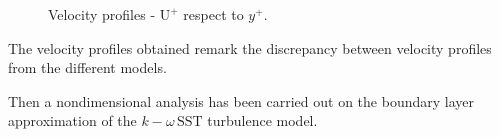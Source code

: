 \documentclass[a4paper,12pt]{article}
\newcommand{\komegasst}{$k\!-\!\omega \, \text{SST} $ }
\begin{document}
\begin{figure}[H]
\centering
{}
\caption{Velocity profiles - $\text{U}^+$ respect to $y^+$.}
\end{figure}


The velocity profiles obtained remark the discrepancy between velocity profiles from the different models.

Then a nondimensional analysis has been carried out on the boundary layer approximation of the \komegasst turbulence model.

\end{document}

